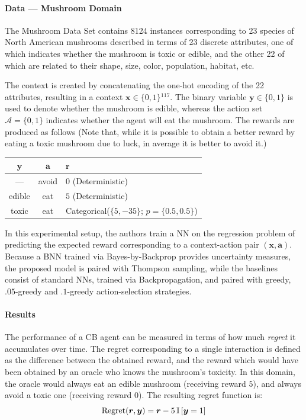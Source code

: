 \documentclass[11pt]{article}
\begin{document}

\paragraph{Data --- Mushroom Domain} The Mushroom Data Set\cite{mushroom}
contains 8124 instances corresponding to 23 species of North American mushrooms
described in terms of 23 discrete attributes, one of which indicates whether
the mushroom is toxic or edible, and the other 22 of which are related to their
shape, size, color, population, habitat, etc.

The context is created by concatenating the one-hot encoding of the 22
attributes, resulting in a context $\bm x\in \{0, 1\}{}^{117}$.  The binary
variable $\bm y\in\{0, 1\}$ is used to denote whether the mushroom is edible,
whereas the action set $\mathcal{A} = \{0, 1\}$ indicates whether the agent
will eat the mushroom.  The rewards are produced as follows (Note that, while
it is possible to obtain a better reward by eating a toxic mushroom due to
luck, in average it is better to avoid it.)

\begin{center}
\begin{tabular}{ccl}
  $\bm y$ & $\bm a$ & $\bm r$ \\ 
  \toprule
  --- & avoid & $0$ (Deterministic) \\
  edible & eat & $5$ (Deterministic) \\
  toxic & eat & Categorical\@($\{5, -35\}$; $p=\{0.5, 0.5\}$) \\  
\end{tabular}
\end{center}

In this experimental setup, the authors train a NN on the regression problem of
predicting the expected reward corresponding to a context-action pair $(\bm x,
\bm a)$.  
Because a BNN trained via Bayes-by-Backprop provides
uncertainty measures, the proposed model is paired with Thompson sampling,
while the baselines consist of standard NNs, trained via Backpropagation, and
paired with greedy, $.05$-greedy and $.1$-greedy action-selection strategies.


\paragraph{Results} 

The performance of a CB agent can be measured in terms of how much
\emph{regret} it accumulates over time.  The regret corresponding to a single
interaction is defined as the difference between the obtained reward, and the
reward which would have been obtained by an oracle who knows the mushroom's
toxicity.  In this domain, the oracle would always eat an edible mushroom
(receiving reward $5$), and always avoid a toxic one (receiving reward $0$).
The resulting regret function is:
%
\begin{equation}
  \operatorname{Regret}(\bm r, \bm y) = \bm r - 5 \, {\mathbb{I}}\left[ \bm
  y = 1 \right]
\end{equation}
\end{document}
